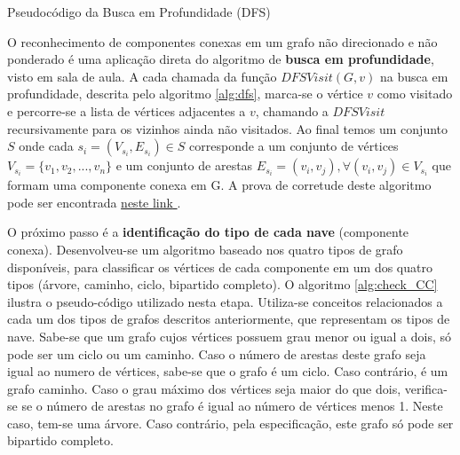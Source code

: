 \begin{algorithm}[tb]
	\caption{Pseudocódigo da Busca em Profundidade (DFS)}
	\label{alg:dfs}
\end{algorithm}
O reconhecimento de componentes conexas em um grafo não direcionado e não ponderado é uma aplicação direta do algoritmo de \textbf{busca em profundidade}, visto em sala de aula. A cada chamada da função $DFSVisit(G, v)$ na busca em profundidade, descrita pelo algoritmo \ref{alg:dfs}, marca-se o vértice $v$ como visitado e percorre-se a lista de vértices adjacentes a $v$, chamando a $DFSVisit$ recursivamente para os vizinhos ainda não visitados. Ao final temos um conjunto $S$ onde cada $s_i = (V_{s_i}, E_{s_i}) \in S$ corresponde a um conjunto de vértices $V_{s_i} = \{v_1, v_2, ..., v_n\}$ e um conjunto de arestas $E_{s_i} = (v_i, v_j), \forall (v_i, v_j) \in V_{s_i}$ que formam uma componente conexa em G. A prova de corretude deste algoritmo pode ser encontrada \href{http://web.stanford.edu/class/archive/cs/cs161/cs161.1176/Lectures/CS161Lecture10.pdf}{{\color{blue} neste link} }.

O próximo passo é a \textbf{identificação do tipo de cada nave} (componente conexa). Desenvolveu-se um algoritmo baseado nos quatro tipos de grafo disponíveis, para classificar os vértices de cada componente em um dos quatro tipos (árvore, caminho, ciclo, bipartido completo). O algoritmo \ref{alg:check_CC} ilustra o pseudo-código utilizado nesta etapa. Utiliza-se conceitos relacionados a cada um dos tipos de grafos descritos anteriormente, que representam os tipos de nave. Sabe-se que um grafo cujos vértices possuem grau menor ou igual a dois, só pode ser um ciclo ou um caminho. Caso o número de arestas deste grafo seja igual ao numero de vértices, sabe-se que o grafo é um ciclo. Caso contrário, é um grafo caminho. Caso o grau máximo dos vértices seja maior do que dois, verifica-se se o número de arestas no grafo é igual ao número de vértices menos 1. Neste caso, tem-se uma árvore. Caso contrário, pela especificação, este grafo só pode ser bipartido completo.


